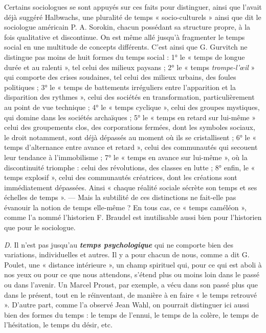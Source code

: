 {Certains sociologues se sont appuyés sur ces faits pour distinguer, ainsi
que l'avait déjà suggéré Halbwachs, une pluralité de temps « socio-culturels »
ainsi que dit le sociologue américain P. A. Sorokin, chacun possédant sa
structure propre, à la fois qualitative et discontinue. On est même allé
jusqu’à fragmenter le temps social en une multitude de concepts différents.
C'est ainsi que G. Gurvitch ne distingue pas moins de huit formes du
temps social : 1° le « temps de longue durée et au ralenti », tel celui des
milieux paysans ; 2° le « temps {\it trompe-l'œil} » qui comporte des crises soudaines,
tel celui des milieux urbains, des foules politiques ; 3° le « temps de
battements irréguliers entre l'apparition et la disparition des rythmes »,
celui des sociétés en transformation, particulièrement au point de vue
technique ; 4° le « temps cyclique », celui des groupes mystiques, qui
domine dans les sociétés archaïques ; 5° le « temps en retard sur lui-même »
celui des groupements clos, des corporations fermées, dont les symboles
sociaux, le droit notamment, sont déjà dépassés au moment où ils se cristallisent ;
6° le « temps d’alternance entre avance et retard », celui des
communautés qui secouent leur tendance à l’immobilisme ; 7° le « temps en
avance sur lui-même », où la discontinuité triomphe : celui des révolutions,
des classes en lutte ; 8° enfin, le « temps explosif », celui des communautés
créatrices, dont les créations sont immédiatement dépassées. Ainsi « chaque
réalité sociale sécrète son temps et ses échelles de temps ». — Mais la subtilité
de ces distinctions ne fait-elle pas évanouir la notion de temps elle-même ?
En tous cas, ce « temps caméléon », comme l’a nommé l'historien F. Braudel
est inutilisable aussi bien pour l'historien que pour le sociologue.}
\vspace{0.31cm}

{\it D.} Il n’est pas jusqu’au \textbf{\textit {temps psychologique}} qui ne comporte
bien des variations, individuelles et autres. Il y a pour chacun de nous,
comme a dit G. Poulet, une « distance intérieure », un champ spirituel
qui, pour ce qui est aboli à nos yeux ou pour ce que nous attendons,
s'étend plus ou moins loin dans le passé ou dans l’avenir. Un Marcel
Proust, par exemple, a vécu dans son passé plus que dans le présent,
tout en le réinventant, de manière à en faire « le temps retrouvé ».
D'autre part, comme l’a observé Jean Wahl, on pourrait distinguer
ici aussi bien des formes du temps : le temps de l'ennui, le temps de
la colère, le temps de l’hésitation, le temps du désir, etc.

